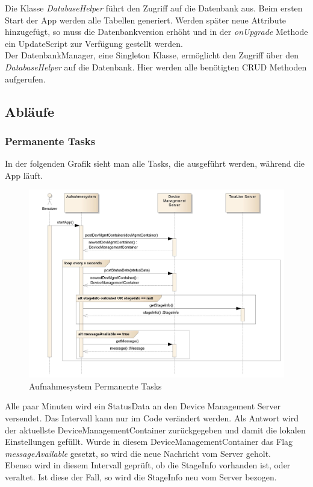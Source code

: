Die Klasse \textit{DatabaseHelper} führt den Zugriff auf die Datenbank aus. Beim ersten Start der App werden alle Tabellen generiert. Werden später neue Attribute hinzugefügt, so muss die Datenbankversion erhöht und in der \textit{onUpgrade} Methode ein UpdateScript zur Verfügung gestellt werden.\\

Der DatenbankManager, eine Singleton Klasse, ermöglicht den Zugriff über den \textit{DatabaseHelper} auf die Datenbank. Hier werden alle benötigten CRUD Methoden aufgerufen.

\subsection{Abläufe}

\subsubsection{Permanente Tasks}
In der folgenden Grafik sieht man alle Tasks, die ausgeführt werden, während die App läuft. 
\begin{figure}[H]
	\centering
	\includegraphics[width=150mm]{images/android/permanent_taskes.jpg}
	\caption{Aufnahmesystem Permanente Tasks}
\end{figure}
Alle paar Minuten wird ein StatusData an den Device Management Server versendet. Das Intervall kann nur im Code verändert werden. Als Antwort wird der aktuellste DeviceManagementContainer zurückgegeben und damit die lokalen Einstellungen gefüllt. Wurde in diesem DeviceManagementContainer das Flag \textit{messageAvailable} gesetzt, so wird die neue Nachricht vom Server geholt.\\
Ebenso wird in diesem Intervall geprüft, ob die StageInfo vorhanden ist, oder veraltet. Ist diese der Fall, so wird die StageInfo neu vom Server bezogen.

